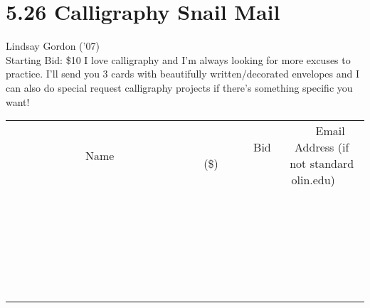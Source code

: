 \documentclass[11pt]{article}
\begin{document}
\section*{5.26 Calligraphy Snail Mail}
Lindsay Gordon ('07)
\\
Starting Bid: \$10
\newline
I love calligraphy and I'm always looking for more excuses to practice. I’ll send you 3 cards with beautifully written/decorated envelopes and I can also do special request calligraphy projects if there's something specific you want!
\\[6ex]
\begin{tabular}{c c c}
~~~~~~~~~~~~~Name~~~~~~~~~~~~~ & ~~~~~~~~~Bid (\$)~~~~~~~~~  & ~~~Email Address (if not standard olin.edu)~~~\\
 & & \\
\hline
 & & \\
\hline
 & & \\
\hline
 & & \\
\hline
 & & \\
\hline
 & & \\
\hline
 & & \\
\hline
 & & \\
\hline
 & & \\
\hline
 & & \\
\hline
 & & \\
\hline
 & & \\
\hline
 & & \\
\hline
 & & \\
\hline
 & & \\
\hline
 & & \\
\hline
 & & \\
\hline
 & & \\
\hline
 & & \\
\hline
 & & \\
\hline
 & & \\
\hline
 & & \\
\hline
 & & \\
\hline
 & & \\
\hline
 & & \\
\hline
 & & \\
\hline
\end{tabular}
\newpage
\end{document}
